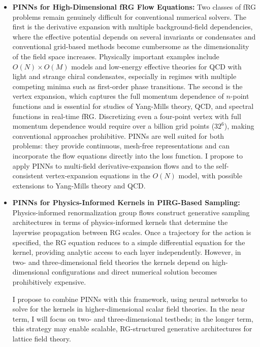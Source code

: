 \documentclass[11pt,a4paper]{article}
\begin{document}
\begin{itemize}
    \item \textbf{PINNs for High-Dimensional fRG Flow Equations:} Two classes of fRG problems remain genuinely difficult for conventional numerical solvers. The first is the derivative expansion with multiple background-field dependencies, where the effective potential depends on several invariants or condensates and conventional grid-based methods become cumbersome as the dimensionality of the field space increases. Physically important examples include $O(N)\times O(M)$ models and low-energy effective theories for QCD with light and strange chiral condensates, especially in regimes with multiple competing minima such as first-order phase transitions. The second is the vertex expansion, which captures the full momentum dependence of $n$-point functions and is essential for studies of Yang-Mills theory\cite{Cyrol:2016tym}, QCD\cite{Fu:2025hcm}, and spectral functions in real-time fRG\cite{Tan:2021zid}. Discretizing even a four-point vertex with full momentum dependence would require over a billion grid points ($32^6$), making conventional approaches prohibitive. PINNs are well suited for both problems: they provide continuous, mesh-free representations and can incorporate the flow equations directly into the loss function. I propose to apply PINNs to multi-field derivative-expansion flows and to the self-consistent vertex-expansion equations in the $O(N)$ model, with possible extensions to Yang-Mills theory and QCD.


    \item \textbf{PINNs for Physics-Informed Kernels in PIRG-Based Sampling:} Physics-informed renormalization group flows\cite{Ihssen:2025ybn} construct generative sampling architectures in terms of physics-informed kernels that determine the layerwise propagation between RG scales. Once a trajectory for the action is specified, the RG equation reduces to a simple differential equation for the kernel, providing analytic access to each layer independently. However, in two- and three-dimensional field theories the kernels depend on high-dimensional configurations and direct numerical solution becomes prohibitively expensive.

    I propose to combine PINNs with this framework, using neural networks to solve for the kernels in higher-dimensional scalar field theories. In the near term, I will focus on two- and three-dimensional testbeds; in the longer term, this strategy may enable scalable, RG-structured generative architectures for lattice field theory.
    \end{itemize}
\end{document}
